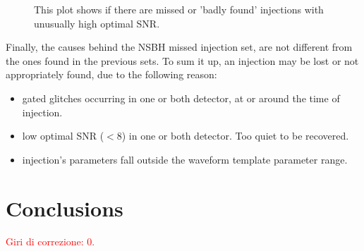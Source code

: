 \documentclass[binding=0.6cm, LaM]{sapthesis}
\newcommand{\fpg}[1]{\textcolor{red}{#1} }
\begin{document}
                \begin{figure}[h]
                        \noindent
                        \label{missed_inj}
                        \centering
                        \caption{ This plot shows if there are missed or 'badly found' injections with unusually high optimal SNR. }
			 \label{fig:missed_inj}
                \end{figure}
	Finally, the causes behind the NSBH missed injection set, 
	are not different from the ones found in the previous sets.
	To sum it up, an injection may  be lost or not appropriately found,
	due to the following reason:
	\begin{itemize}
		\item gated glitches occurring in one or both detector, at or around the time of injection.
		\item low optimal SNR ($<$8) in one or both detector. Too quiet to be recovered.
		\item injection’s parameters fall outside the waveform template parameter range.
	\end{itemize}

\chapter*{Conclusions}

\fpg{Giri di correzione: 0.}%
\end{document}
